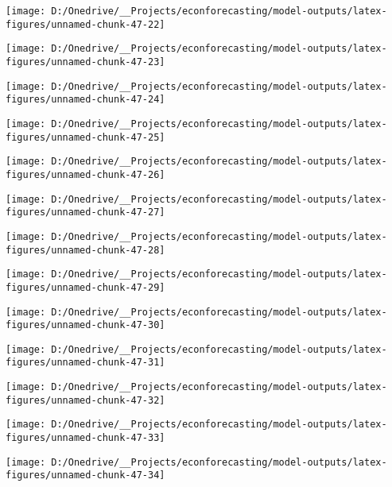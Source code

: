 \documentclass[11pt, letterpaper]{article}\usepackage[]{graphicx}\usepackage[]{color}
\begin{document}
{\centering \texttt{[image: D:/Onedrive/\_\_Projects/econforecasting/model-outputs/latex-figures/unnamed-chunk-47-22]} 

}




{\centering \texttt{[image: D:/Onedrive/\_\_Projects/econforecasting/model-outputs/latex-figures/unnamed-chunk-47-23]} 

}




{\centering \texttt{[image: D:/Onedrive/\_\_Projects/econforecasting/model-outputs/latex-figures/unnamed-chunk-47-24]} 

}




{\centering \texttt{[image: D:/Onedrive/\_\_Projects/econforecasting/model-outputs/latex-figures/unnamed-chunk-47-25]} 

}




{\centering \texttt{[image: D:/Onedrive/\_\_Projects/econforecasting/model-outputs/latex-figures/unnamed-chunk-47-26]} 

}




{\centering \texttt{[image: D:/Onedrive/\_\_Projects/econforecasting/model-outputs/latex-figures/unnamed-chunk-47-27]} 

}




{\centering \texttt{[image: D:/Onedrive/\_\_Projects/econforecasting/model-outputs/latex-figures/unnamed-chunk-47-28]} 

}




{\centering \texttt{[image: D:/Onedrive/\_\_Projects/econforecasting/model-outputs/latex-figures/unnamed-chunk-47-29]} 

}




{\centering \texttt{[image: D:/Onedrive/\_\_Projects/econforecasting/model-outputs/latex-figures/unnamed-chunk-47-30]} 

}




{\centering \texttt{[image: D:/Onedrive/\_\_Projects/econforecasting/model-outputs/latex-figures/unnamed-chunk-47-31]} 

}




{\centering \texttt{[image: D:/Onedrive/\_\_Projects/econforecasting/model-outputs/latex-figures/unnamed-chunk-47-32]} 

}




{\centering \texttt{[image: D:/Onedrive/\_\_Projects/econforecasting/model-outputs/latex-figures/unnamed-chunk-47-33]} 

}




{\centering \texttt{[image: D:/Onedrive/\_\_Projects/econforecasting/model-outputs/latex-figures/unnamed-chunk-47-34]} 

}
\end{document}
